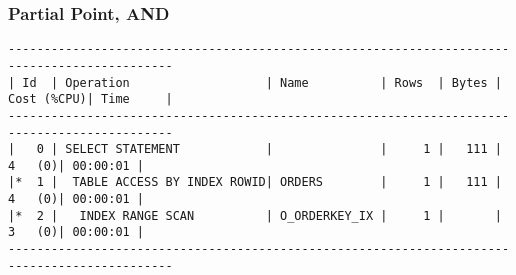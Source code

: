 \documentclass[11pt,a4paper,parskip=half]{scrartcl}
\begin{document}
\subsubsection{Partial Point, AND}

\begin{lstlisting}
---------------------------------------------------------------------------------------------                                                                                                                                                                                                                
| Id  | Operation                   | Name          | Rows  | Bytes | Cost (%CPU)| Time     |                                                                                                                                                                                                                
---------------------------------------------------------------------------------------------                                                                                                                                                                                                                
|   0 | SELECT STATEMENT            |               |     1 |   111 |     4   (0)| 00:00:01 |                                                                                                                                                                                                                
|*  1 |  TABLE ACCESS BY INDEX ROWID| ORDERS        |     1 |   111 |     4   (0)| 00:00:01 |                                                                                                                                                                                                                
|*  2 |   INDEX RANGE SCAN          | O_ORDERKEY_IX |     1 |       |     3   (0)| 00:00:01 |                                                                                                                                                                                                                
---------------------------------------------------------------------------------------------                                                                                                                                                                                                                
                                                                                                                                                                                                                                                                                                             

\end{lstlisting}
\end{document}
